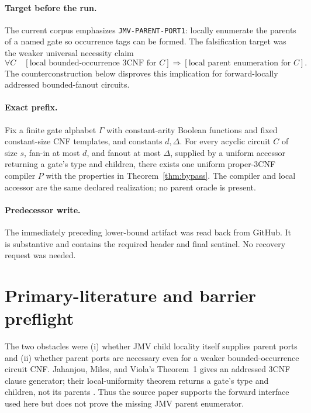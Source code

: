\documentclass[11pt]{article}
\begin{document}
\paragraph{Target before the run.}
The current corpus emphasizes \texttt{JMV-PARENT-PORT1}: locally enumerate
the parents of a named gate so occurrence tags can be formed.  The
falsification target was the weaker universal necessity claim
\[
  \forall C\quad
  [\text{local bounded-occurrence 3CNF for }C]
  \Longrightarrow [\text{local parent enumeration for }C].
\]
The counterconstruction below disproves this implication for
forward-locally addressed bounded-fanout circuits.

\paragraph{Exact prefix.}
Fix a finite gate alphabet $\Gamma$ with constant-arity Boolean functions
and fixed constant-size CNF templates, and constants $d,\Delta$.  For every
acyclic circuit $C$ of size $s$, fan-in at most $d$, and fanout at most
$\Delta$, supplied by a uniform accessor returning a gate's type and
children, there exists one uniform proper-3CNF compiler $P$ with the
properties in Theorem~\ref{thm:bypass}.  The compiler and local accessor
are the same declared realization; no parent oracle is present.

\paragraph{Predecessor write.}
The immediately preceding lower-bound artifact
was read back from GitHub.  It is substantive and contains the required
header and final sentinel.  No recovery request was needed.

\section{Primary-literature and barrier preflight}

The two obstacles were (i) whether JMV child locality itself supplies
parent ports and (ii) whether parent ports are necessary even for a weaker
bounded-occurrence circuit CNF.  Jahanjou, Miles, and Viola's Theorem~1
gives an addressed 3CNF clause generator; their local-uniformity theorem
returns a gate's type and children, not its parents \cite{jmv}.  Thus the
source paper supports the forward interface used here but does not prove
the missing JMV parent enumerator.
\end{document}
